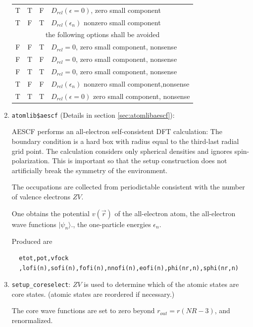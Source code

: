 \documentclass[11pt,a4paper]{report}
\begin{document}
\begin{enumerate}
\begin{center}
\begin{tabular}{|c|c|c|l|}
T & T & F & $D_{rel}(\epsilon=0)$, zero small component\\
T & F & T & $D_{rel}(\epsilon_n)$ nonzero small component\\
\hline
\multicolumn{4}{|c|}{the following options shall be avoided}\\
\hline
F & F & T & $D_{rel}=0$, zero small component, nonsense\\
F & T & F & $D_{rel}=0$, zero small component, nonsense\\
F & T & T & $D_{rel}=0$, zero small component, nonsense\\
T & F & F & $D_{rel}(\epsilon_n)$ nonzero small component,nonsense\\
T & T & T & $D_{rel}(\epsilon=0)$ zero small component, nonsense\\
\hline
\end{tabular}
\end{center}
%
\item \verb|atomlib$aescf| (Details in section  \ref{sec:atomlibaescf}):

  AESCF performs an all-electron self-consistent
  DFT calculation: The boundary condition is a hard box with radius
  equal to the third-last radial grid point. The calculation considers
  only spherical densities and ignores spin-polarization. This is
  important so that the setup construction does not artificially break
  the symmetry of the environment.

  The occupations are collected from periodictable consistent with the
  number of valence electrons $ZV$.

  One obtains the potential $v(\vec{r})$ of the all-electron atom, the
  all-electron wave functions $|\psi_n\rangle$., the one-particle
  energies $\epsilon_n$.

  Produced are
  \begin{verbatim}
  etot,pot,vfock
  ,lofi(n),sofi(n),fofi(n),nnofi(n),eofi(n),phi(nr,n),sphi(nr,n)
  \end{verbatim}
%
\item \verb|setup_coreselect|: $ZV$ is used to determine which of the
  atomic states are core states. (atomic states are reordered if
  necessary.)  

  The core wave functions are set to zero beyond $r_{out}=r(NR-3)$,
  and renormalized.


\end{enumerate}
\end{document}
